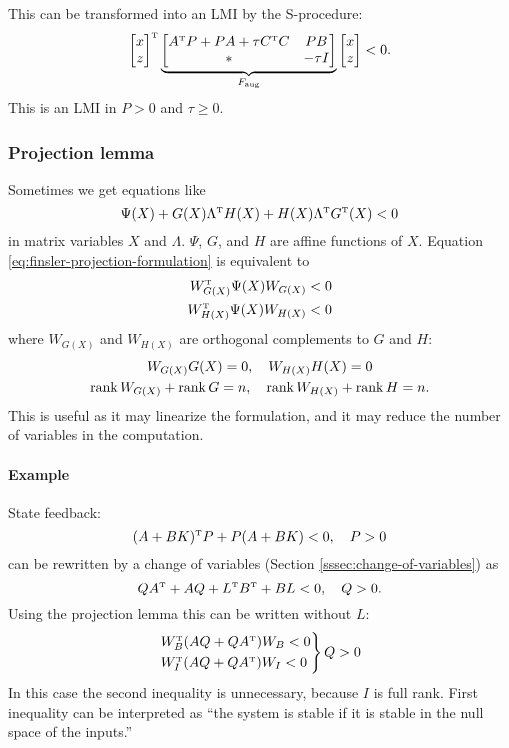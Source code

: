 This can be transformed into an LMI by the S-procedure:
%
\begin{equation}
  \bmat{x \\ z}\tp
  \underbrace
    {
      \begin{bmatrix}
        A\tp P + PA + \tau C\tp C & PB \\
        * & -\tau I
      \end{bmatrix}
    }_{F\sub{aug}}
  \bmat{x \\ z}
  < 0.
\end{equation}
%
This is an LMI in $P>0$ and $\tau \geq 0$.

\subsubsection{Projection lemma}
Sometimes we get equations like
%
\begin{equation}\label{eq:finsler-projection-formulation}
  \Psi(X) + G(X)\Lambda\tp H(X) + H(X)\Lambda\tp G\tp(X) < 0
\end{equation}
%
in matrix variables $X$ and $\Lambda$. $\Psi$, $G$, and $H$ are affine functions of $X$. Equation \eqref{eq:finsler-projection-formulation} is equivalent to
%
\begin{equation}
  \begin{split}
    W_{G(X)}\tp \Psi(X) W_{G(X)} &< 0 \\
    W_{H(X)}\tp \Psi(X) W_{H(X)} &< 0
  \end{split}
\end{equation}
%
where $W_{G(X)}$ and $W_{H(X)}$ are orthogonal complements to $G$ and $H$:
\begin{gather}
  W_{G(X)} G(X) = 0,\quad W_{H(X)} H(X) = 0 \\
  \operatorname{rank} W_{G(X)} + \operatorname{rank} G = n,\quad \operatorname{rank} W_{H(X)} + \operatorname{rank} H = n.
\end{gather}
%
This is useful as it may linearize the formulation, and it may reduce the number of variables in the computation.

\paragraph{Example} State feedback:
%
\begin{equation}
  (A + BK)\tp P + P(A + BK) < 0,\quad P > 0
\end{equation}
%
can be rewritten by a change of variables (Section \ref{sssec:change-of-variables}) as
%
\begin{equation}
  QA\tp + AQ + L\tp B\tp + BL < 0,\quad Q > 0.
\end{equation}
%
Using the projection lemma this can be written without $L$:
%
\begin{equation}
  \begin{rcases}
    W_B\tp(AQ+QA\tp)W_B < 0 \\
    W_I\tp(AQ+QA\tp)W_I < 0
  \end{rcases} Q > 0
\end{equation}
%
In this case the second inequality is unnecessary, because $I$ is full rank. First inequality can be interpreted as ``the system is stable if it is stable in the null space of the inputs.''

